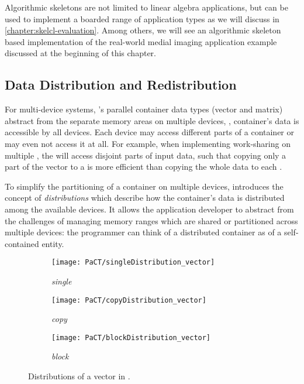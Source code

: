\noindent
Algorithmic skeletons are not limited to linear algebra applications, but can be used to implement a boarded range of application types as we will discuss in \autoref{chapter:skelcl-evaluation}.
Among others, we will see an algorithmic skeleton based implementation of the real-world medial imaging application example discussed at the beginning of this chapter.


\subsection{Data Distribution and Redistribution}
\label{section:skelcl-programming-model:distribution}

For multi-device systems, \SkelCL's parallel container data types (vector and matrix) abstract from the separate memory areas on multiple \OpenCL devices, \ie, container's data is accessible by all devices.
Each device may access different parts of a container or may even not access it at all.
For example, when implementing work-sharing on multiple \GPUs, the \GPUs will access disjoint parts of input data, such that copying only a part of the vector to a \GPU is more efficient than copying the whole data to each \GPU.

To simplify the partitioning of a container on multiple devices, \SkelCL introduces the concept of \emph{distributions} which describe how the container's data is distributed among the available devices.
It allows the application developer to abstract from the challenges of managing memory ranges which are shared or partitioned across multiple devices: the programmer can think of a distributed container as of a self-contained entity.



\begin{figure}[tb]
  \centering
  \begin{subfigure}{.3\textwidth}
    \texttt{[image: PaCT/singleDistribution\_vector]}
    \caption{\emph{single}}
    \label{fig:distributions:single}
  \end{subfigure}
  \hfill
  \begin{subfigure}{.3\textwidth}
    \texttt{[image: PaCT/copyDistribution\_vector]}
    \caption{\emph{copy}}
    \label{fig:distributions:copy}
  \end{subfigure}
  \hfill
  \begin{subfigure}{.3\textwidth}
    \texttt{[image: PaCT/blockDistribution\_vector]}
    \caption{\emph{block}}
    \label{fig:distributions:block}
  \end{subfigure}
  \caption{Distributions of a vector in \SkelCL.}
  \label{fig:distributions}
  \bigskip
\end{figure}


